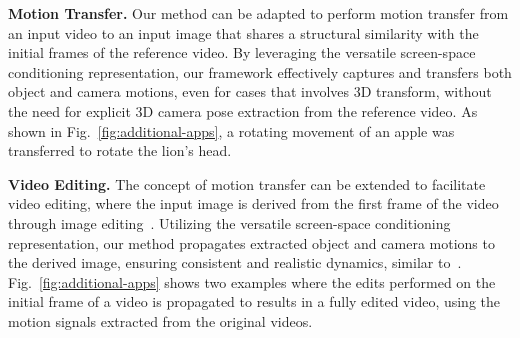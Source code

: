 \textbf{Motion Transfer.}
Our method can be adapted to perform motion transfer from an input video to an input image that shares a structural similarity with the initial frames of the reference video. By leveraging the versatile screen-space conditioning representation, our framework effectively captures and transfers both object and camera motions, even for cases that involves 3D transform, without the need for explicit 3D camera pose extraction from the reference video. As shown in Fig.~\ref{fig:additional-apps}, a rotating movement of an apple was transferred to rotate the lion's head. 

\textbf{Video Editing.}
The concept of motion transfer can be extended to facilitate video editing, where the input image is derived from the first frame of the video through image editing~\cite{brooks2023instructpix2pix}. Utilizing the versatile screen-space conditioning representation, our method propagates extracted object and camera motions to the derived image, ensuring consistent and realistic dynamics, similar to~\cite{liu2024generative}. Fig.~\ref{fig:additional-apps} shows two examples where the edits performed on the initial frame of a video is propagated to results in a fully edited video, using the motion signals extracted from the original videos. 
